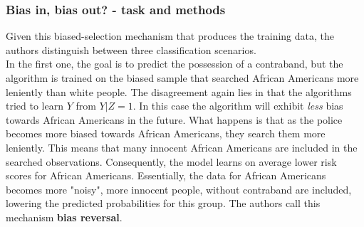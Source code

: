 \subsubsection*{Bias in, bias out? - task and methods}
Given this biased-selection mechanism that produces the training data, the authors distinguish between three classification scenarios.\\
In the first one, the goal is to predict the possession of a contraband, but the algorithm is trained on the biased sample that searched African Americans more leniently than white people. The disagreement again lies in that the algorithms tried to learn $Y$ from $Y | Z = 1$. In this case the algorithm will exhibit \textit{less} bias towards African Americans in the future. What happens is that as the police becomes more biased towards African Americans, they search them more leniently. This means that many innocent African Americans are included in the searched observations. Consequently, the model learns on average lower risk scores for African Americans. Essentially, the data for African Americans becomes more "noisy", more innocent people, without contraband are included, lowering the predicted probabilities for this group. The authors call this mechanism \textbf{bias reversal}.



